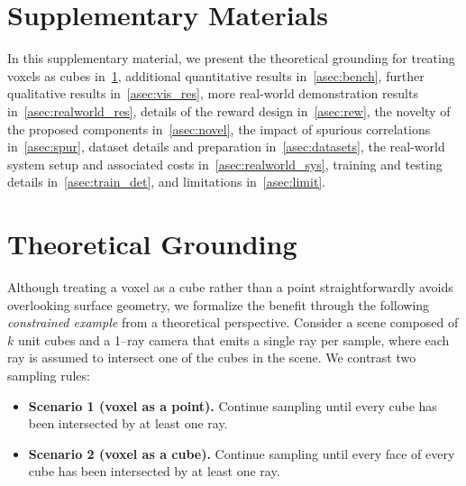 \newcommand{\xmark}{\ding{55}} %
\renewcommand{\theequation}{S\arabic{equation}}
\renewcommand{\thefigure}{S\arabic{figure}}
\renewcommand{\thetable}{S\arabic{table}}
\renewcommand{\thesection}{S\arabic{section}}
\renewcommand{\thesubsection}{S\arabic{section}.\arabic{subsection}}
\renewcommand{\algorithmiccomment}[1]{\hspace{0.5em}\(\triangleright\) #1}
\setcounter{figure}{0}
\setcounter{table}{0}
\setcounter{equation}{0}
\setcounter{section}{0}
\setcounter{subsection}{0}
\setcounter{subsubsection}{0}

\section*{Supplementary Materials}

In this supplementary material, we present the theoretical grounding for treating voxels as cubes in~\cref{asec:theory}, additional quantitative results in~\cref{asec:bench}, further qualitative results in~\cref{asec:vis_res}, more real-world demonstration results in~\cref{asec:realworld_res}, details of the reward design in~\cref{asec:rew}, the novelty of the proposed components in~\cref{asec:novel}, the impact of spurious correlations in~\cref{asec:spur}, dataset details and preparation in~\cref{asec:datasets}, the real-world system setup and associated costs in~\cref{asec:realworld_sys}, training and testing details in~\cref{asec:train_det}, and limitations in~\cref{asec:limit}.

\section{Theoretical Grounding}
\label{asec:theory}

Although treating a voxel as a cube rather than a point straightforwardly avoids overlooking surface geometry, we formalize the benefit through the following \textit{constrained example} from a theoretical perspective.
Consider a scene composed of \(k\) unit cubes and a 1–ray camera that emits a single ray per sample, where each ray is assumed to intersect one of the cubes in the scene.
We contrast two sampling rules:
\begin{itemize}
  \item \textbf{Scenario 1 (voxel as a point).} Continue sampling until every cube has been intersected by at least one ray.
  \item \textbf{Scenario 2 (voxel as a cube).} Continue sampling until every face of every cube has been intersected by at least one ray.
\end{itemize}

